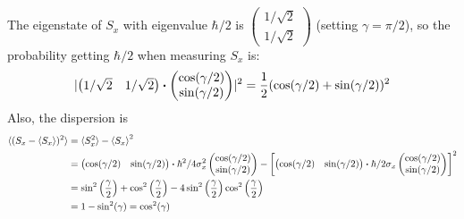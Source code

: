\documentclass{article}
\begin{document}
The eigenstate of $S_x$ with eigenvalue $\hbar/2$ is $ \begin{pmatrix}
    1/\sqrt{2} \\ 1/\sqrt{2}
\end{pmatrix}$ (setting $\gamma=\pi/2$), so the probability getting
$\hbar/2$ when measuring $S_x$ is:
\begin{equation}
    \lvert 
    \begin{pmatrix}
        1/\sqrt{2} & 1/\sqrt{2}
    \end{pmatrix}\vdot \begin{pmatrix}
        \cos(\gamma/2) \\ \sin(\gamma/2)
    \end{pmatrix}
    \rvert^2
    = \frac{1}{2}(\cos(\gamma/2)+\sin(\gamma/2))^2
\end{equation}
Also, the dispersion is
\begin{align*}
    \braket{(S_x-\braket{S_x})^2} 
    &= \braket{S_x^2} - \braket{S_x}^2
    \\
    &=
    \begin{pmatrix}
        \cos(\gamma/2) & \sin(\gamma/2)
    \end{pmatrix}
    \vdot
    \hbar^2/4 \sigma_x^2
    \begin{pmatrix}
        \cos(\gamma/2) \\ \sin(\gamma/2)
    \end{pmatrix}
    -
    \left[
    \begin{pmatrix}
        \cos(\gamma/2) & \sin(\gamma/2)
    \end{pmatrix}
    \vdot
    \hbar/2 \sigma_x
    \begin{pmatrix}
        \cos(\gamma/2) \\ \sin(\gamma/2)
    \end{pmatrix}
    \right]^2
    \\
    &=
    \sin ^2\left(\frac{\gamma}{2}\right)+\cos
    ^2\left(\frac{\gamma}{2}\right)-4 \sin ^2\left(\frac{\gamma}{2}\right)
    \cos ^2\left(\frac{\gamma}{2}\right)
    \\
    &=
    1-\sin^2(\gamma) = \cos^2(\gamma)
\end{align*}
\end{document}
